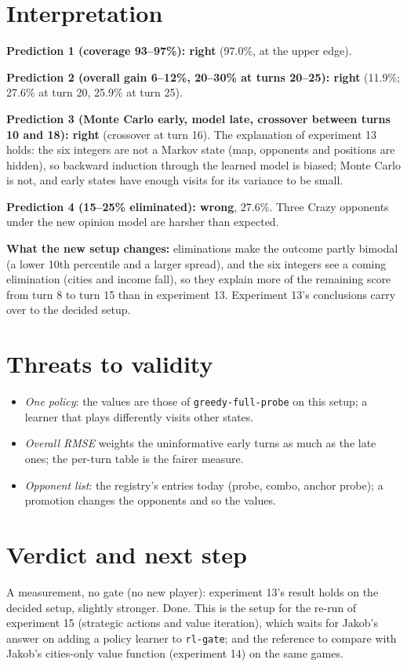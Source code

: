 \documentclass{../polyexp}
\begin{document}
\section{Interpretation}
\textbf{Prediction 1 (coverage 93--97\%): right} (97.0\%, at the upper edge).

\textbf{Prediction 2 (overall gain 6--12\%, 20--30\% at turns 20--25): right} (11.9\%; 27.6\% at turn 20, 25.9\%
at turn 25).

\textbf{Prediction 3 (Monte Carlo early, model late, crossover between turns 10 and 18): right} (crossover at turn
16). The explanation of experiment 13 holds: the six integers are not a Markov state (map, opponents and positions
are hidden), so backward induction through the learned model is biased; Monte Carlo is not, and early states have
enough visits for its variance to be small.

\textbf{Prediction 4 (15--25\% eliminated): wrong}, 27.6\%. Three Crazy opponents under the new opinion model are
harsher than expected.

\textbf{What the new setup changes:} eliminations make the outcome partly bimodal (a lower 10th percentile and a
larger spread), and the six integers see a coming elimination (cities and income fall), so they explain more of the
remaining score from turn 8 to turn 15 than in experiment 13. Experiment 13's conclusions carry over to the decided
setup.


\section{Threats to validity}
\begin{itemize}
  \item \emph{One policy}: the values are those of \texttt{greedy-full-probe} on this setup; a learner that plays
        differently visits other states.
  \item \emph{Overall RMSE} weights the uninformative early turns as much as the late ones; the per-turn table is the
        fairer measure.
  \item \emph{Opponent list}: the registry's entries today (probe, combo, anchor probe); a promotion changes the
        opponents and so the values.
\end{itemize}

\section{Verdict and next step}
A measurement, no gate (no new player): experiment 13's result holds on the decided setup, slightly stronger. Done.
This is the setup for the re-run of experiment 15 (strategic actions and value iteration), which waits for Jakob's
answer on adding a policy learner to \texttt{rl-gate}; and the reference to compare with Jakob's cities-only value
function (experiment 14) on the same games.
\end{document}
